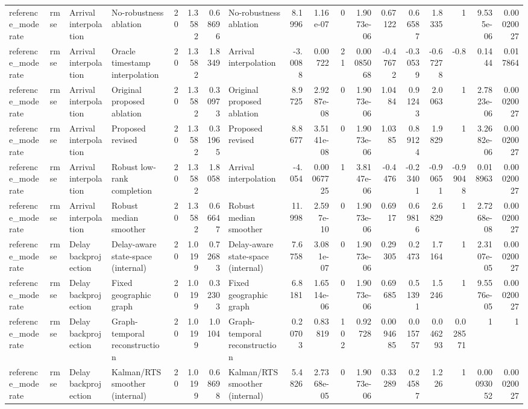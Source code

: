 \begin{table}[!htbp]
{\begin{tabular}{llllrrrlrrrrrrrrrr}
reference_moderate & rmse & Arrival interpolation & No-robustness ablation & 20 & 1.3582 & 0.68696 & No-robustness ablation & 8.1996 & 1.16e-07 & 0 & 1.9073e-06 & 0.67122 & 0.66587 & 1.8335 & 1 & 9.535e-06 & 0.00020027 \\
reference_moderate & rmse & Arrival interpolation & Oracle timestamp interpolation & 20 & 1.3582 & 1.8349 & Arrival interpolation & -3.0088 & 0.00722 & 21 & 0.00085068 & -0.47672 & -0.30539 & -0.67278 & -0.8 & 0.1444 & 0.017864 \\
reference_moderate & rmse & Arrival interpolation & Original proposed ablation & 20 & 1.3582 & 0.30973 & Original proposed ablation & 8.9725 & 2.9287e-08 & 0 & 1.9073e-06 & 1.0484 & 0.91243 & 2.0063 & 1 & 2.7823e-06 & 0.00020027 \\
reference_moderate & rmse & Arrival interpolation & Proposed revised & 20 & 1.3582 & 0.31965 & Proposed revised & 8.8677 & 3.5141e-08 & 0 & 1.9073e-06 & 1.0385 & 0.89124 & 1.9829 & 1 & 3.2682e-06 & 0.00020027 \\
reference_moderate & rmse & Arrival interpolation & Robust low-rank completion & 20 & 1.3582 & 1.8058 & Arrival interpolation & -4.054 & 0.00067725 & 1 & 3.8147e-06 & -0.4476 & -0.23401 & -0.90651 & -0.99048 & 0.018963 & 0.00020027 \\
reference_moderate & rmse & Arrival interpolation & Robust median smoother & 20 & 1.3582 & 0.66647 & Robust median smoother & 11.998 & 2.597e-10 & 0 & 1.9073e-06 & 0.6917 & 0.69816 & 2.6829 & 1 & 2.7268e-08 & 0.00020027 \\
reference_moderate & rmse & Delay backprojection & Delay-aware state-space (internal) & 20 & 1.0199 & 0.72683 & Delay-aware state-space (internal) & 7.6758 & 3.081e-07 & 0 & 1.9073e-06 & 0.29305 & 0.2473 & 1.7164 & 1 & 2.3107e-05 & 0.00020027 \\
reference_moderate & rmse & Delay backprojection & Fixed geographic graph & 20 & 1.0199 & 0.32303 & Fixed geographic graph & 6.8181 & 1.6514e-06 & 0 & 1.9073e-06 & 0.69685 & 0.51391 & 1.5246 & 1 & 9.5576e-05 & 0.00020027 \\
reference_moderate & rmse & Delay backprojection & Graph-temporal reconstruction & 20 & 1.0199 & 1.0104 & Graph-temporal reconstruction & 0.20703 & 0.83819 & 102 & 0.92728 & 0.0094685 & 0.015757 & 0.046293 & 0.028571 & 1 & 1 \\
reference_moderate & rmse & Delay backprojection & Kalman/RTS smoother (internal) & 20 & 1.0199 & 0.68698 & Kalman/RTS smoother (internal) & 5.4826 & 2.7368e-05 & 0 & 1.9073e-06 & 0.33289 & 0.24587 & 1.226 & 1 & 0.00093052 & 0.00020027 \\

\end{tabular}}
\end{table}
